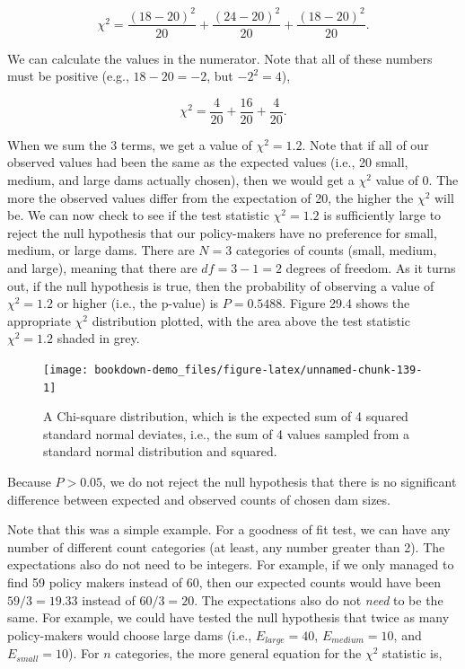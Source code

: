 \documentclass[
]{scrbook}
\begin{document}
\[\chi^{2} = \frac{(18 - 20)^{2}}{20} + \frac{(24 - 20)^{2}}{20} + \frac{(18 - 20)^{2}}{20}.\]

We can calculate the values in the numerator.
Note that all of these numbers must be positive (e.g., \(18 - 20 = -2\), but \(-2^{2} = 4\)),

\[\chi^{2} = \frac{4}{20} + \frac{16}{20} + \frac{4}{20}.\]

When we sum the 3 terms, we get a value of \(\chi^{2} = 1.2\).
Note that if all of our observed values had been the same as the expected values (i.e., 20 small, medium, and large dams actually chosen), then we would get a \(\chi^{2}\) value of 0.
The more the observed values differ from the expectation of 20, the higher the \(\chi^{2}\) will be.
We can now check to see if the test statistic \(\chi^{2} = 1.2\) is sufficiently large to reject the null hypothesis that our policy-makers have no preference for small, medium, or large dams.
There are \(N = 3\) categories of counts (small, medium, and large), meaning that there are \(df = 3 - 1 = 2\) degrees of freedom.
As it turns out, if the null hypothesis is true, then the probability of observing a value of \(\chi^{2} = 1.2\) or higher (i.e., the p-value) is \(P = 0.5488\).
Figure 29.4 shows the appropriate \(\chi^{2}\) distribution plotted, with the area above the test statistic \(\chi^{2} = 1.2\) shaded in grey.

\begin{figure}
\texttt{[image: bookdown-demo\_files/figure-latex/unnamed-chunk-139-1]} \caption{A Chi-square distribution, which is the expected sum of 4 squared standard normal deviates, i.e., the sum of 4 values sampled from a standard normal distribution and squared.}\label{fig:unnamed-chunk-139}
\end{figure}

Because \(P > 0.05\), we do not reject the null hypothesis that there is no significant difference between expected and observed counts of chosen dam sizes.

Note that this was a simple example.
For a goodness of fit test, we can have any number of different count categories (at least, any number greater than 2).
The expectations also do not need to be integers.
For example, if we only managed to find 59 policy makers instead of 60, then our expected counts would have been \(59/3 = 19.33\) instead of \(60/3 = 20\).
The expectations also do not \emph{need} to be the same.
For example, we could have tested the null hypothesis that twice as many policy-makers would choose large dams (i.e., \(E_{large} = 40\), \(E_{medium} = 10\), and \(E_{small} = 10\)).
For \(n\) categories, the more general equation for the \(\chi^{2}\) statistic is,
\end{document}
